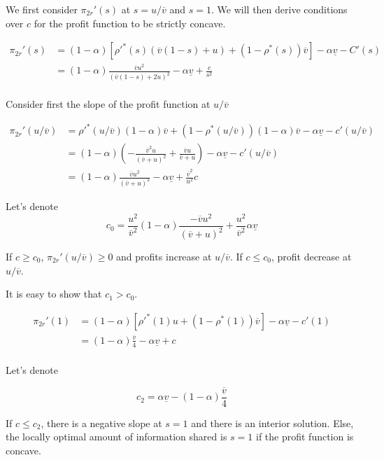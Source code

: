 \documentclass[a4paper,leqno]{article}%
\renewcommand{\a}{\alpha}
\newcommand{\uv}{\underline{v}}
\newcommand{\ov}{\overline{v}}
\begin{document}
We first consider $\pi_{2r}'(s)$ at $s=u/\ov$ and $s=1$. We will then derive conditions over $c$ for the profit function to be strictly concave.

\begin{equation}
    \begin{aligned}
\pi_{2r}'(s)&=(1-\a)\left[\rho'^*(s)(\ov(1-s)+u)+(1-\rho^*(s))\ov\right]-\a\uv-C'(s)\\
            &=(1-\a)\frac{\ov u^2}{(\ov(1-s)+2u)^2}-\a\uv+\frac{c}{s^2}\\
\end{aligned}
\end{equation}

Consider first the slope of the profit function at $u/\ov$

\begin{equation}
    \begin{aligned}
\pi_{2r}'(u/\ov)&=\rho'^*(u/\ov)(1-\a)\ov+(1-\rho^*(u/\ov))(1-\a)\ov -\a\uv-c'(u/\ov)\\
                &=(1-\a)(-\frac{\ov^2 u}{(\ov+u)^2}+\frac{\ov u}{\ov+u}) -\a\uv-c'(u/\ov)\\
                &=(1-\a)\frac{\ov u^2}{(\ov+u)^2}-\a\uv+\frac{\ov^2}{u^2}c
\end{aligned}
\end{equation}

Let's denote $$c_0=\frac{u^2}{\ov^2}(1-\a)\frac{-\ov u^2}{(\ov+u)^2}+\frac{u^2}{\ov^2}\a\uv$$

If $c\geq c_0$,  $\pi_{2r}'(u/\ov)\geq 0$ and profits increase at $u/\ov$. If $c\leq c_0$, profit decrease at $u/\ov$.

It is easy to show that $c_1>c_0$.



\begin{equation}
    \begin{aligned}
\pi_{2r}'(1)&=(1-\a)\left[\rho'^*(1)u+(1-\rho^*(1))\ov\right] -\a\uv-c'(1)\\
            &=(1-\a)\frac{\ov}{4}-\a\uv+c\\
\end{aligned}
\end{equation}

Let's denote 

$$c_2=\a\uv-(1-\a)\frac{\ov}{4}$$

If $c\leq c_2$, there is a negative slope at $s=1$ and there is an interior solution. Else, the locally optimal amount of information shared is $s=1$ if the profit function is concave.
\end{document}
